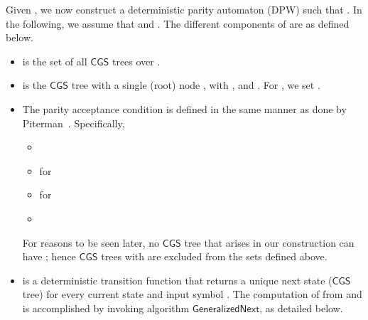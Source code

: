\documentclass[3p]{elsarticle}
\newcommand{\CGS}{\ensuremath{\textsf{CGS }}}
\newcommand{\algo}[1]{\ensuremath{\textsf{{#1}}}}
\begin{document}
Given , we now construct a
deterministic parity automaton (DPW)  such that .  In the following, we
assume that  and .  The different components of
 are as defined below.
\begin{itemize}
\item  is the set of all \CGS trees over .
  
\item  is the \CGS tree with a single (root) node , with
  ,  and . For , we
  set .
  
\item The parity acceptance condition  is defined in the same manner as done by
  Piterman~\cite{piterman}.  Specifically,
  \begin{itemize}
    
  \item 
    
  \item  for 
    
  \item  for 
    
  \item 
    
  \end{itemize}
  \noindent For reasons to be seen later, no \CGS tree that arises
  in our construction can have ; hence \CGS trees with 
  are excluded from the  sets defined above.
  
\item  is a deterministic transition function that returns a
  unique next state (\CGS tree)  for every current state 
  and input symbol .  The computation of  from
   and  is accomplished by invoking algorithm
  \algo{GeneralizedNext}, as detailed below.
\end{itemize}
\end{document}
